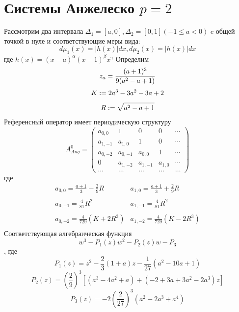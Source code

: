 \documentclass{report}
\begin{document}
\newpage
\section{Системы Анжелеско $p=2$}
Рассмотрим два интервала $\Delta_1=[a,0], \Delta_2=[0,1] (-1 \leq a <0)$ c общей точкой в нуле и соответствующие меры вида:
$$
d\mu_1(x)=|h(x)|dx, d\mu_2(x)=|h(x)|dx
$$ 
где $h(x)=(x-a)^\alpha(x-1)^\beta x^\gamma$
Определим
$$
z_a=\frac{(a+1)^3}{9(a^2-a+1)} \\
$$
$$
K :=2a^3-3a^2-3a+2 \\ 
$$
$$
R :=\sqrt{a^2-a+1} \\
$$
Референсный оператор имеет периодическую структуру
$$
A^0_{Ang}=
\left(\begin{array}{cccccccccccc}
a_{0,0}  & 1 		& 0 	  & 0 		 &  \cdots \\
a_{1,-1} & a_{1,0}  & 1 	  & 0 		 &  \cdots \\
a_{0,-2} & a_{0,-1} & a_{0,0} & 1 		 &  \cdots \\
0 		 & a_{1,-2} & a_{1,-1} & a_{1,0} &  \cdots \\
\ldots & \ldots & \ldots & \ldots & \ldots
\end{array}\right)
$$
где 
$$
\begin{array}{llllllllllllllll}
a_{0,0} = \displaystyle\frac {a+1}{3}-\displaystyle\frac{2}{9}R & a_{1,0}=\displaystyle\frac{a+1}{3}+\displaystyle\frac{2}{9}R \\ \\ 
a_{0,-1}= \displaystyle\frac {4}{81}R^2 & a_{1,-1}=\displaystyle\frac{4}{81}R^2 \\ \\
a_{0,-2}= \displaystyle\frac {4}{729}(K+2R^3) & a_{1,-2}=\displaystyle\frac{4}{729}(K-2R^3) \\
\end{array}
$$
Соответствующая алгебраическая функция
$$
w^3-P_1(z)w^2-P_2(z)w-P_3
$$
, где
$$
P_1(z)=z^2-\frac{2}{3}(1+a)z-\frac{1}{27}(a^2-10a+1)
$$
$$
P_2(z)=\left(\frac{2}{9}\right)^3[(a^3-4a^2+a)+(-2+3a+3a^2-2a^3)z]
$$
$$
P_3(z)=-2 \left(\frac{2}{27} \right)^3 (a^2-2a^3+a^4)
$$
\end{document}
